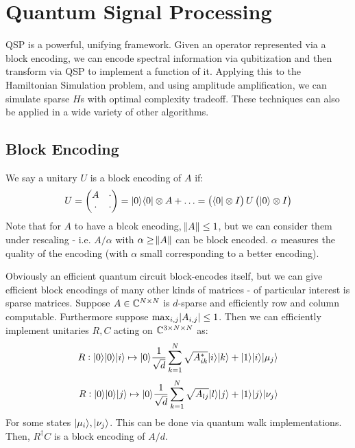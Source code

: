 \section{Quantum Signal Processing}

QSP is a powerful, unifying framework. Given an operator represented via a block encoding, we can encode spectral information via qubitization and then transform via QSP to implement a function of it. Applying this to the Hamiltonian Simulation problem, and using amplitude amplification, we can simulate sparse $H$s with optimal complexity tradeoff. These techniques can also be applied in a wide variety of other algorithms.

\subsection*{Block Encoding}
We say a unitary $U$ is a block encoding of $A$ if:
\begin{equation}
    U = \begin{pmatrix}A & \cdot \\ \cdot & \cdot\end{pmatrix} = \lvert 0 \rangle \langle 0 \rvert \otimes A + \ldots = \left(\langle 0 \rvert \otimes I\right)U\left(\lvert 0 \rangle \otimes I\right)
\end{equation}
Note that for $A$ to have a blcok encoding, $\norm{A} \leq 1$, but we can consider them under rescaling - i.e. $A/\alpha$ with $\alpha \geq \norm{A}$ can be block encoded. $\alpha$ measures the quality of the encoding (with $\alpha$ small corresponding to a better encoding).

Obviously an efficient quantum circuit block-encodes itself, but we can give efficient block encodings of many other kinds of matrices - of particular interest is sparse matrices. Suppose $A \in \mathbb{C}^{N \times N}$ is $d$-sparse and efficiently row and column computable. Furthermore suppose $\max_{i, j}\lvert A_{i,j} \rvert \leq 1$. Then we can efficiently implement unitaries $R, C$ acting on $\mathbb{C}^{3 \times N \times N}$ as:
\begin{equation}
    R: \lvert 0 \rangle\lvert 0 \rangle\lvert i \rangle \mapsto \lvert 0 \rangle\frac{1}{\sqrt{d}}\sum_{k=1}^N\sqrt{A^*_{ik}}\lvert i \rangle\lvert k \rangle + \lvert 1 \rangle\lvert i \rangle\lvert \mu_j \rangle
\end{equation}
\begin{equation}
    R: \lvert 0 \rangle\lvert 0 \rangle\lvert j \rangle \mapsto \lvert 0 \rangle\frac{1}{\sqrt{d}}\sum_{k=1}^N\sqrt{A_{lj}}\lvert l \rangle\lvert j \rangle + \lvert 1 \rangle\lvert j \rangle\lvert \nu_j \rangle
\end{equation}
For some states $\lvert \mu_i \rangle, \lvert \nu_j \rangle$. This can be done via quantum walk implementations. Then, $R^\dag C$ is a block encoding of $A/d$. 

